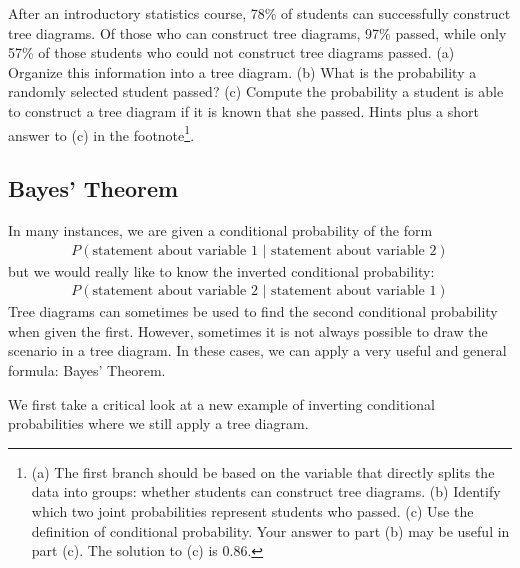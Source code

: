 \begin{exercise}
After an introductory statistics course, 78\% of students can successfully construct tree diagrams. Of those who can construct tree diagrams, 97\% passed, while only 57\% of those students who could not construct tree diagrams passed. (a) Organize this information into a tree diagram. (b) What is the probability a randomly selected student passed? (c) Compute the probability a student is able to construct a tree diagram if it is known that she passed. Hints plus a short answer to (c) in the footnote\footnote{(a) The first branch should be based on the variable that directly splits the data into groups: whether students can construct tree diagrams. (b) Identify which two joint probabilities represent students who passed. (c) Use the definition of conditional probability. Your answer to part (b) may be useful in part (c). The solution to (c) is 0.86.}.
\end{exercise}


\subsection{Bayes' Theorem}

In many instances, we are given a conditional probability of the form
\begin{align*}
P(\text{statement about variable 1 } | \text{ statement about variable 2})
\end{align*}
but we would really like to know the inverted conditional probability:
\begin{align*}
P(\text{statement about variable 2 } | \text{ statement about variable 1})
\end{align*}
Tree diagrams can sometimes be used to find the second conditional probability when given the first. However, sometimes it is not always possible to draw the scenario in a tree diagram. In these cases, we can apply a very useful and general formula: Bayes' Theorem.

We first take a critical look at a new example of inverting conditional probabilities where we still apply a tree diagram.

